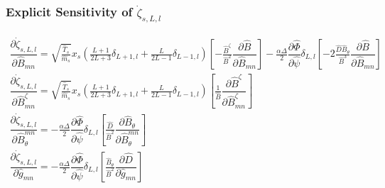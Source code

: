 \documentclass[11pt]{amsart}
\newcommand{\partder}[2]{\dfrac{\partial #1}{\partial #2}} %
\begin{document}
\subsubsection{Explicit Sensitivity of $\dot{\zeta}_{s,L,l}$}
\begin{gather}
\partder{\dot{\zeta}_{s,L,l}}{\hat{B}_{mn}} = \sqrt{\frac{\hat{T}_s}{\hat{m}_s} } x_s \left( \frac{L+1}{2L+3} \delta_{L+1,l} + \frac{L}{2L-1} \delta_{L-1,l} \right) \left[ - \frac{\hat{B}^{\zeta}}{\hat{B}^2} \partder{\hat{B}}{\hat{B}_{mn}} \right] - \frac{\alpha \Delta}{2} \partder{\hat{\Phi}}{\hat{\psi}} \delta_{L,l} \left[ -2 \frac{\hat{D} \hat{B}_{\theta}}{\hat{B}^3} \partder{\hat{B}}{\hat{B}_{mn}} \right] \\
\partder{\dot{\zeta}_{s,L,l}}{\hat{B}^{\zeta}_{mn}} = \sqrt{\frac{\hat{T}_s}{\hat{m}_s} } x_s \left( \frac{L+1}{2L+3} \delta_{L+1,l} + \frac{L}{2L-1} \delta_{L-1,l} \right) \left[ \frac{1}{\hat{B}} \partder{\hat{B}^{\zeta}}{\hat{B}^{\zeta}_{mn}} \right] \\
\partder{\dot{\zeta}_{s,L,l}}{\hat{B}_{\theta}^{mn}} = - \frac{\alpha \Delta}{2} \partder{\hat{\Phi}}{\hat{\psi}} \delta_{L,l} \left[ \frac{\hat{D}}{\hat{B}^2} \partder{\hat{B}_{\theta}}{\hat{B}_{\theta}^{mn}} \right] \\
\partder{\dot{\zeta}_{s,L,l}}{\hat{g}_{mn}} = - \frac{\alpha \Delta}{2} \partder{\hat{\Phi}}{\hat{\psi}} \delta_{L,l} \left[ \frac{\hat{B}_{\theta}}{\hat{B}^2} \partder{\hat{D}}{\hat{g}_{mn}} \right]
\end{gather}
\end{document}
